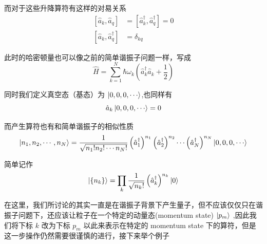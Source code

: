 而对于这些升降算符有这样的对易关系
\begin{align*}
    \left[\hat{a}_k,\hat{a}_q\right] &= \left[\hat{a}_k^\dagger,\hat{a}_q^\dagger\right] = 0 \\
    \left[\hat{a}_k,\hat{a}_q^\dagger\right] &= \delta _{kq}
\end{align*}

此时的哈密顿量也可以像之前的简单谐振子问题一样，写成
\begin{equation*}
    \hat{H} = \sum_{k=1}^{N} \hbar\omega_k \left(\hat{a}_k^\dagger \hat{a}_k + \frac{1}{2}\right)
\end{equation*}

同时我们定义真空态（基态）为 $\displaystyle \ket{0,0,0,\cdots}$,也同样有
\begin{equation*}
    \hat{a}_k \ket{0,0,0,\cdots} = 0
\end{equation*}

而产生算符也有和简单谐振子的相似性质
\begin{equation*}
    \ket{n_1,n_2,\cdots,n_N} = \frac{1}{\sqrt{n_1! n_2! \cdots n_N!}}\left(\hat{a}_1^\dagger\right)^{n_1}\left(\hat{a}_2^\dagger\right)^{n_2}\cdots\left(\hat{a}_N^\dagger\right)^{n_N} \ket{0,0,0,\cdots}
\end{equation*}

简单记作
\begin{equation*}
    \ket{\left\{n_k\right\}} = \prod_k \frac{1}{\sqrt{n_k!}}\left(\hat{a}_k^\dagger\right)^{n_k}\ket{0}
\end{equation*}

在这里，我们所讨论的其实一直是在谐振子背景下产生量子，但不应该仅仅只在谐振子问题下，还应该让粒子在一个特定的动量态(momentum state) $\ket{p_m}$ ,因此我们将下标 $k$ 改为下标 $p_m$ 以此来表示在特定的 momentum state 下的算符，但是这一步操作仍然需要很谨慎的进行，接下来举个例子

